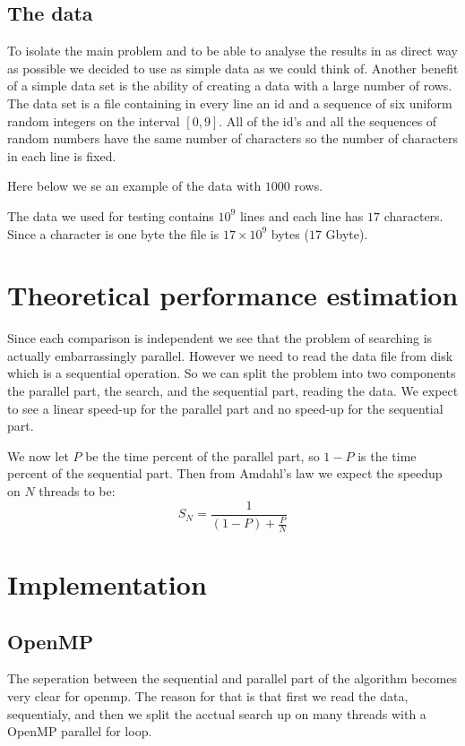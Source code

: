\documentclass[a4paper,10pt]{article}
\begin{document}
\subsection{The data}
To isolate the main problem and to be able to analyse the results in as direct way as possible we decided to use as simple data as we could think of.
Another benefit of a simple data set is the ability of creating a data with a large number of rows. 
The data set is a file containing in every line an id and a sequence of six uniform random integers on the interval $[0,9]$.  
All of the id's and all the sequences of random numbers have the same number of characters so the number of characters in each line is fixed.

Here below we se an example of the data with $1000$ rows.
  
The data we used for testing contains $10^{9}$ lines and each line has $17$ characters.  Since a character is one byte
the file is $17 \times 10^9$ bytes ($17$ Gbyte).

\section{Theoretical performance estimation}

Since each comparison is independent we see that the problem of searching is actually 
embarrassingly parallel.  
However we need to read the data file from disk which is a sequential operation.  
So we can split the problem into two components the parallel part, the search,
and the sequential part, reading the data.
We expect to see a linear speed-up for the parallel part and
no speed-up for the sequential part.

We now let $P$ be the time percent of the parallel  
part, so $1-P$ is the time percent of the sequential part.  
Then from Amdahl's law we expect the speedup on $N$ threads to be:
$$ S_N = \frac{1}{(1-P)+\frac{P}{N}}$$

\section{Implementation}
  
\subsection{OpenMP}

  
  The seperation between the sequential and parallel part of the algorithm becomes very clear 
  for openmp. The reason for that is that first we read the data, sequentialy, and then we
  split the acctual search up on many threads with a OpenMP parallel for loop.  
  
\end{document}
